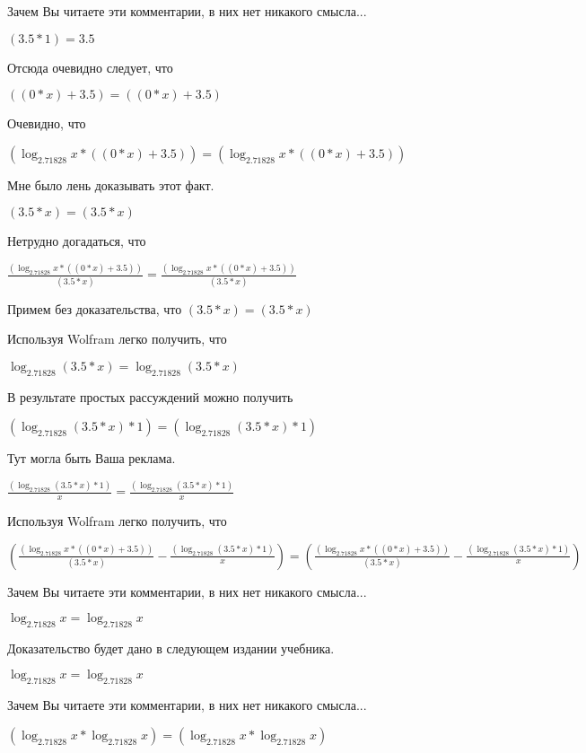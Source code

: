 \documentclass[12pt,a4paper,fleqn]{article}
\theoremstyle{definition}
\begin{document}
Зачем Вы читаете эти комментарии, в них нет никакого смысла...

$( 3.5  *  1 ) =  3.5 $

Отсюда очевидно следует, что

$(( 0  *  x ) +  3.5 ) = (( 0  *  x ) +  3.5 )$

Очевидно, что

$(\log_{ 2.71828 }{ x } * (( 0  *  x ) +  3.5 )) = (\log_{ 2.71828 }{ x } * (( 0  *  x ) +  3.5 ))$

Мне было лень доказывать этот факт.

$( 3.5  *  x ) = ( 3.5  *  x )$

Нетрудно догадаться, что

$\frac{(\log_{ 2.71828 }{ x } * (( 0  *  x ) +  3.5 ))}{( 3.5  *  x )}
 = \frac{(\log_{ 2.71828 }{ x } * (( 0  *  x ) +  3.5 ))}{( 3.5  *  x )}
$

Примем без доказательства, что
$( 3.5  *  x ) = ( 3.5  *  x )$

Используя Wolfram легко получить, что

$\log_{ 2.71828 }{( 3.5  *  x )} = \log_{ 2.71828 }{( 3.5  *  x )}$

В результате простых рассуждений можно получить

$(\log_{ 2.71828 }{( 3.5  *  x )} *  1 ) = (\log_{ 2.71828 }{( 3.5  *  x )} *  1 )$

Тут могла быть Ваша реклама.

$\frac{(\log_{ 2.71828 }{( 3.5  *  x )} *  1 )}{ x }
 = \frac{(\log_{ 2.71828 }{( 3.5  *  x )} *  1 )}{ x }
$

Используя Wolfram легко получить, что

$(\frac{(\log_{ 2.71828 }{ x } * (( 0  *  x ) +  3.5 ))}{( 3.5  *  x )}
 - \frac{(\log_{ 2.71828 }{( 3.5  *  x )} *  1 )}{ x }
) = (\frac{(\log_{ 2.71828 }{ x } * (( 0  *  x ) +  3.5 ))}{( 3.5  *  x )}
 - \frac{(\log_{ 2.71828 }{( 3.5  *  x )} *  1 )}{ x }
)$

Зачем Вы читаете эти комментарии, в них нет никакого смысла...

$\log_{ 2.71828 }{ x } = \log_{ 2.71828 }{ x }$

Доказательство будет дано в следующем издании учебника.

$\log_{ 2.71828 }{ x } = \log_{ 2.71828 }{ x }$

Зачем Вы читаете эти комментарии, в них нет никакого смысла...

$(\log_{ 2.71828 }{ x } * \log_{ 2.71828 }{ x }) = (\log_{ 2.71828 }{ x } * \log_{ 2.71828 }{ x })$
\end{document}
